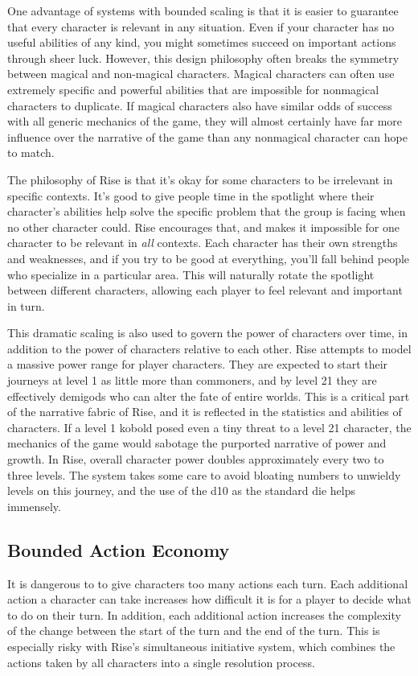     One advantage of systems with bounded scaling is that it is easier to guarantee that every character is relevant in any situation.
    Even if your character has no useful abilities of any kind, you might sometimes succeed on important actions through sheer luck.
    However, this design philosophy often breaks the symmetry between magical and non-magical characters.
    Magical characters can often use extremely specific and powerful abilities that are impossible for nonmagical characters to duplicate.
    If magical characters also have similar odds of success with all generic mechanics of the game, they will almost certainly have far more influence over the narrative of the game than any nonmagical character can hope to match.

    The philosophy of Rise is that it's okay for some characters to be irrelevant in specific contexts.
    It's good to give people time in the spotlight where their character's abilities help solve the specific problem that the group is facing when no other character could.
    Rise encourages that, and makes it impossible for one character to be relevant in \textit{all} contexts.
    Each character has their own strengths and weaknesses, and if you try to be good at everything, you'll fall behind people who specialize in a particular area.
    This will naturally rotate the spotlight between different characters, allowing each player to feel relevant and important in turn.

    This dramatic scaling is also used to govern the power of characters over time, in addition to the power of characters relative to each other.
    Rise attempts to model a massive power range for player characters.
    They are expected to start their journeys at level 1 as little more than commoners, and by level 21 they are effectively demigods who can alter the fate of entire worlds.
    This is a critical part of the narrative fabric of Rise, and it is reflected in the statistics and abilities of characters.
    If a level 1 kobold posed even a tiny threat to a level 21 character, the mechanics of the game would sabotage the purported narrative of power and growth.
    In Rise, overall character power doubles approximately every two to three levels.
    The system takes some care to avoid bloating numbers to unwieldy levels on this journey, and the use of the d10 as the standard die helps immensely.

  \subsection{Bounded Action Economy}
    It is dangerous to to give characters too many actions each turn.
    Each additional action a character can take increases how difficult it is for a player to decide what to do on their turn.
    In addition, each additional action increases the complexity of the change between the start of the turn and the end of the turn.
    This is especially risky with Rise's simultaneous initiative system, which combines the actions taken by all characters into a single resolution process.

